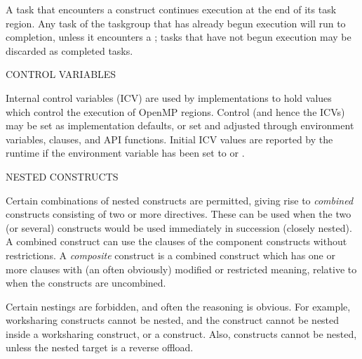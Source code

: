 A task that encounters a  construct continues execution at the end of its
task region. Any task of the taskgroup that has already begun execution will run to completion,
unless it encounters a ; tasks that have not begun execution may be
discarded as completed tasks.

\pagebreak
CONTROL VARIABLES 

Internal control variables (ICV) are used by implementations to hold values which control the execution
of OpenMP regions. Control (and hence the ICVs) may be set as implementation defaults, 
or set and adjusted through environment variables, clauses, and API functions.
Initial ICV values are reported by the runtime
if the  environment variable has been set to  or . 


\bigskip
NESTED CONSTRUCTS

Certain combinations of nested constructs are permitted, giving rise to \emph{combined} constructs
consisting of two or more directives. These can be used when the two (or several) constructs would be used
immediately in succession (closely nested). A combined construct can use the clauses of the component
constructs without restrictions.
A \emph{composite} construct is a combined construct which has one or more clauses with (an often obviously)
modified or restricted meaning, relative to when the constructs are uncombined.

Certain nestings are forbidden, and often the reasoning is obvious. For example, worksharing constructs cannot be nested, and
the  construct cannot be nested inside a worksharing construct, or a  construct. 
Also,  constructs cannot be nested, unless the nested target is a reverse offload.

